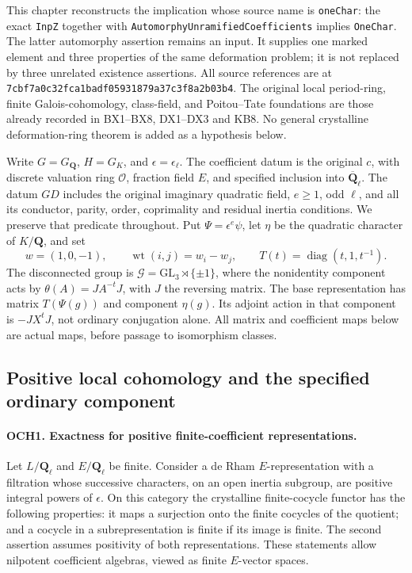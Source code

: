 \documentclass[11pt,a4paper]{article}
\numberwithin{equation}{section}
\theoremstyle{remark}\newtheorem{remark}[theorem]{Remark}
\begin{document}
This chapter reconstructs the implication whose source name is
\texttt{one\allowbreak Char}: the exact \texttt{Inp\allowbreak Z} together with
\texttt{Automorphy\allowbreak Unramified\allowbreak Coefficients} implies \texttt{One\allowbreak Char}.
The latter automorphy assertion remains an input.  It supplies one
marked element and three properties of the same deformation problem;
it is not replaced by three unrelated existence assertions.
All source references are at
\texttt{7cbf7a0c32fca1badf05931879a37c3f8a2b03b4}.
The original local period-ring, finite Galois-cohomology, class-field,
and Poitou--Tate foundations are those already recorded in BX1--BX8,
DX1--DX3 and KB8.  No general crystalline deformation-ring theorem is
added as a hypothesis below.

Write \(G=G_{\mathbf Q}\), \(H=G_K\), and
\(\epsilon=\epsilon_\ell\).  The coefficient datum is the original
\(c\), with discrete valuation ring \(\mathcal O\), fraction field
\(E\), and specified inclusion into
\(\overline{\mathbf Q}_\ell\).  The datum \(GD\) includes the
original imaginary quadratic field, \(e\ge1\), odd \(\ell\),
and all its conductor, parity, order, coprimality and residual
inertia conditions.  We preserve that predicate throughout.
Put \(\Psi=\epsilon^e\psi\), let \(\eta\) be the quadratic
character of \(K/\mathbf Q\), and set
\[
 w=(1,0,-1),\qquad \operatorname{wt}(i,j)=w_i-w_j,
 \qquad T(t)=\operatorname{diag}(t,1,t^{-1}).
 \tag{OCH.1}
\]
The disconnected group is
\(\mathcal G=\mathrm{GL}_3\rtimes\{\pm1\}\), where the
nonidentity component acts by
\(\theta(A)=J A^{-t}J\), with \(J\) the reversing matrix.
The base representation has matrix \(T(\Psi(g))\) and component
\(\eta(g)\).  Its adjoint action in that component is
\(-JX^tJ\), not ordinary conjugation alone.
All matrix and coefficient maps below are actual maps, before passage
to isomorphism classes.

\subsection{Positive local cohomology and the specified ordinary component}

\paragraph{OCH1. Exactness for positive finite-coefficient representations.}
\label{claim:OCH1}
Let \(L/\mathbf Q_\ell\) and \(E/\mathbf Q_\ell\) be finite.
Consider a de Rham \(E\)-representation with a filtration whose
successive characters, on an open inertia subgroup, are positive
integral powers of \(\epsilon\).  On this category the crystalline
finite-cocycle functor has the following properties: it maps a
surjection onto the finite cocycles of the quotient; and a cocycle
in a subrepresentation is finite if its image is finite.  The second
assertion assumes positivity of both representations.  These
statements allow nilpotent coefficient algebras, viewed as finite
\(E\)-vector spaces.
\end{document}
